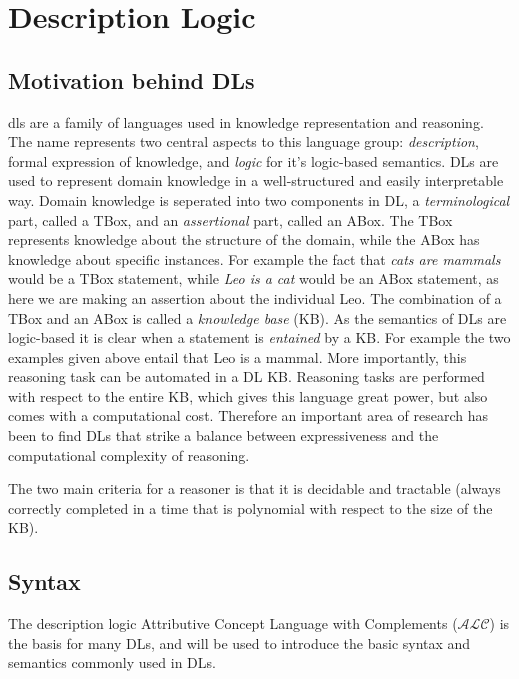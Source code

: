 \chapter{Description Logic}


\section{Motivation behind DLs}
\gls{dls} are a family of languages used in knowledge representation and reasoning. The name represents two central aspects to this language group: \emph{description}, formal expression of knowledge, and  \emph{logic} for it's logic-based semantics. DLs are used to represent domain knowledge in a well-structured and easily interpretable way. Domain knowledge is seperated into two components in DL, a \emph{terminological} part, called a TBox, and an \emph{assertional} part, called an ABox. The TBox represents knowledge about the structure of the domain, while the ABox has knowledge about specific instances. For example the fact that \emph{cats are  mammals} would be a TBox statement, while \emph{Leo is a cat} would be an ABox statement, as here we are making an assertion about the individual Leo. The combination of a TBox and an ABox is called a \emph{knowledge base} (KB).
As the semantics of DLs are logic-based it is clear when a statement is \emph{entained} by a KB. For example the two examples given above entail that Leo is a mammal. More importantly, this reasoning task can be automated in a DL KB. Reasoning tasks are performed with respect to the entire KB, which gives this language great power, but also comes with a computational cost. Therefore an important area of research has been to find DLs that strike a balance between expressiveness and the computational complexity of reasoning.


The two main criteria for a reasoner is that it is decidable and tractable (always correctly completed in a time that is polynomial with respect to the size of the KB).

\section{Syntax}
The description logic Attributive Concept Language with Complements ($\mathcal{ALC}$) is the basis for many DLs, and will be used to introduce the basic syntax and semantics commonly used in DLs.

